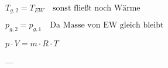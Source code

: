 \( T_{g,2} = T_{EW} \quad \text{sonst fließt noch Wärme} \)  

\( p_{g,2} = p_{g,1} \quad \text{Da Masse von EW gleich bleibt} \)  

\( p \cdot V = m \cdot R \cdot T \)  

---